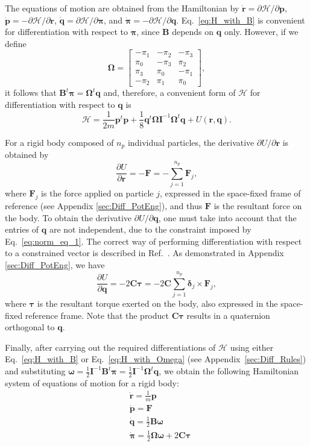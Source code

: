 \documentclass[aip,jcp,reprint,amsmath,amssymb,amsfont]{revtex4-1}
\newcommand{\mt}[1]{\boldsymbol{\mathbf{#1}}}           %
\newcommand{\vt}[1]{\boldsymbol{\mathbf{#1}}}           %
\newcommand{\tr}[1]{#1^t}                               %
\newcommand{\diff}[2]{\dfrac{\partial #1}{\partial #2}} %
\begin{document}
The equations of motion are obtained from the Hamiltonian by $\dot{\vt r} = \partial \mathcal{H} / \partial \vt p$, $\dot{\vt p} = -\partial \mathcal{H} / \partial \vt r$, $\dot{\vt q} = \partial \mathcal{H} / \partial \vt \pi$, and $\dot{\vt \pi} = -\partial \mathcal{H} / \partial \vt q$.\cite{Goldstein2002} Eq.~\ref{eq:H_with_B} is convenient for differentiation with respect to $\vt \pi$, since $\mt B$ depends on $\vt q$ only. However, if we define
\[
\mt \Omega = \left[
\begin{array}{rrrr}
-\pi_1 & -\pi_2 & -\pi_3 \\
 \pi_0 & -\pi_3 &  \pi_2 \\
 \pi_3 &  \pi_0 & -\pi_1 \\
-\pi_2 &  \pi_1 &  \pi_0
\end{array}
\right],
\]
it follows that $\tr{\mt B}{\vt \pi} = \tr{\mt \Omega}{\vt q}$ and, therefore, a convenient form of $\mathcal{H}$ for differentiation with respect to $\vt q$ is
\begin{equation}
\label{eq:H_with_Omega}
\mathcal{H} = \frac{1}{2m} \tr{\vt p} \vt p + \frac{1}{8} \tr{\vt q} {\mt \Omega} {\mt I}^{-1} \tr{\mt \Omega} \vt q + U(\vt r, \vt q).
\end{equation}

For a rigid body composed of $n_p$ individual particles, the derivative $\partial U/\partial \vt r$ is obtained by
\[
\diff{U}{\vt r} = -\vt F = -\sum_{j=1}^{n_p} {\vt F_j},
\]
where $\vt F_j$ is the force applied on particle $j$, expressed in the space-fixed frame of reference (see Appendix \ref{sec:Diff_PotEng}), and thus $\vt F$ is the resultant force on the body. To obtain the derivative $\partial U/\partial \vt q$, one must take into account that the entries of $\vt q$ are not independent, due to the constraint imposed by Eq.~\ref{eq:norm_eq_1}. The correct way of performing differentiation with respect to a constrained vector is described in Ref.~. As demonstrated in Appendix \ref{sec:Diff_PotEng}, we have
\[
\diff{U}{\vt q} = -2 \mt C \vt \tau = -2 \mt C \sum_{j=1}^{n_p} {\vt \delta_j} \times {\vt F_j},
\]
where $\vt \tau$ is the resultant torque exerted on the body, also expressed in the space-fixed reference frame. Note that the product $\mt C \vt \tau$ results in a quaternion orthogonal to $\vt q$.

Finally, after carrying out the required differentiations of $\mathcal{H}$ using either Eq.~\ref{eq:H_with_B} or Eq.~\ref{eq:H_with_Omega} (see Appendix~\ref{sec:Diff_Rules}) and substituting $\vt \omega = \frac{1}{2} {\mt I}^{-1} \tr{\mt B} \vt \pi = \frac{1}{2} {\mt I}^{-1} \tr{\mt \Omega} \vt q$, we obtain the following Hamiltonian system of equations of motion for a rigid body:
\begin{subequations}
\label{eq:EDO_system}
\begin{align}
&\dot{\vt r} = \frac{1}{m} \vt p \\
&\dot{\vt p} = \mt F \\
&\dot{\vt q} = \frac{1}{2} \mt B \vt \omega \\
&\dot{\vt \pi} = \frac{1}{2} \mt \Omega \vt \omega + 2 \mt C \vt \tau
\end{align}
\end{subequations}
\end{document}
